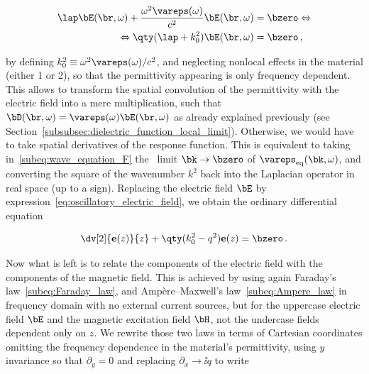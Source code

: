 \begin{equation}
\begin{split}
\lap \bE(\br,\omega) +  \frac{\omega^2 \vareps(\omega)}{c^2} \bE (\br,\omega) &= \bzero \Leftrightarrow \\
\Leftrightarrow \qty(\lap +  k_0^2) \bE (\br,\omega) &= \bzero\,,
\end{split}
\end{equation}


\noindent by defining $k_0^2 \equiv \omega^2 \vareps(\omega) /c^2$, and neglecting nonlocal effects in the material (either 1 or 2), so that the permittivity appearing is only frequency dependent.
This allows to transform the spatial convolution of the permittivity with the electric field into a mere multiplication, such that $\bD(\br,\omega) = \vareps(\omega) \bE(\br,\omega)$ as already explained previously (see Section~\ref{subsubsec:dielectric_function_local_limit}).
Otherwise, we would have to take spatial derivatives of the response function.
This is equivalent to taking in~\eqref{subeq:wave_equation_F} the \lra~limit $\bk \to \bzero$ of $\vareps_{\text{eq}}(\bk,\omega)$, and converting the square of the wavenumber $k^2$ back into the Laplacian operator in real space (up to a sign).
Replacing the electric field $\bE$ by expression~\eqref{eq:oscillatory_electric_field}, we obtain the ordinary differential equation

\begin{equation}
    \dv[2]{\mathbf{e}(z)}{z} + \qty(k_0^2 - q^2) \mathbf{e}(z) = \bzero \,.
\end{equation}

Now what is left is to relate the components of the electric field with the components of the magnetic field.
This is achieved by using again Faraday's law~\eqref{subeq:Faraday_law}, and Amp\`ere--Maxwell's law~\eqref{subeq:Ampere_law} in frequency domain with no external current sources, but for the uppercase electric field $\bE$ and the magnetic excitation field $\bH$, not the undercase fields dependent only on $z$.
We rewrite those two laws in terms of Cartesian coordinates omitting the frequency dependence in the material's permittivity, using $y$ invariance so that $\partial_y = 0$ and replacing $\partial_x \to \ii q$ to write


